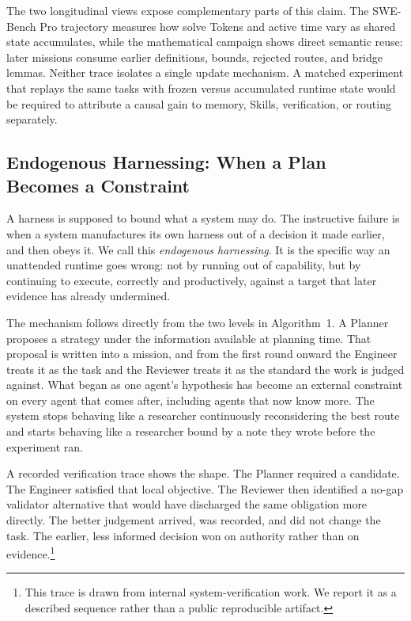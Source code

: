 The two longitudinal views expose complementary parts of this claim. The SWE-Bench
Pro trajectory measures how solve Tokens and active time vary as shared state
accumulates, while the mathematical campaign shows direct semantic reuse: later
missions consume earlier definitions, bounds, rejected routes, and bridge lemmas.
Neither trace isolates a single update mechanism. A matched experiment that replays
the same tasks with frozen versus accumulated runtime state would be required to
attribute a causal gain to memory, Skills, verification, or routing separately.

\subsection{Endogenous Harnessing: When a Plan Becomes a Constraint}
\label{sec:endogenous-harness}

A harness is supposed to bound what a system may do. The instructive failure is when
a system manufactures its own harness out of a decision it made earlier, and then
obeys it. We call this \emph{endogenous harnessing}. It is the specific way an
unattended runtime goes wrong: not by running out of capability, but by continuing to
execute, correctly and productively, against a target that later evidence has already
undermined.

The mechanism follows directly from the two levels in Algorithm~1. A Planner proposes
a strategy under the information available at planning time. That proposal is written
into a mission, and from the first round onward the Engineer treats it as the task and
the Reviewer treats it as the standard the work is judged against. What began as one
agent's hypothesis has become an external constraint on every agent that comes after,
including agents that now know more. The system stops behaving like a researcher
continuously reconsidering the best route and starts behaving like a researcher bound
by a note they wrote before the experiment ran.

A recorded verification trace shows the shape. The Planner required a
 candidate. The Engineer satisfied that local objective. The Reviewer
then identified a no-gap validator alternative that would have discharged the same
obligation more directly. The better judgement arrived, was recorded, and did not
change the task. The earlier, less informed decision won on authority rather than on
evidence.\footnote{This trace is drawn from internal system-verification work. We
report it as a described sequence rather than a public reproducible artifact.}

